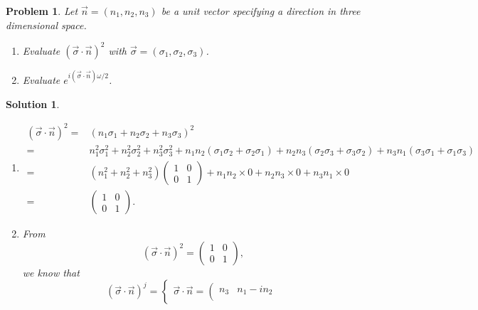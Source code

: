 \documentclass[UTF8,10pt,a4paper]{article}
\theoremstyle{Problem}
\newtheorem{prob}{Problem}
\theoremstyle{Solution}
\newtheorem*{sol}{Solution}
\begin{document}
\begin{prob}
    Let $\vec{n}=(n_1,n_2,n_3)$ be a unit vector specifying a direction in three dimensional space.
    \begin{enumerate}
        \item[(a)] Evaluate $(\vec{\sigma}\cdot\vec{n})^2$ with $\vec{\sigma}=(\sigma_1,\sigma_2,\sigma_3)$.
        \item[(b)] Evaluate $e^{i(\vec{\sigma}\cdot\vec{n})\omega/2}$.
    \end{enumerate}
\end{prob}
\begin{sol}
    \begin{enumerate}
        \item[(a)]
        \begin{align}
            \nonumber(\vec{\sigma}\cdot\vec{n})^2=&(n_1\sigma_1+n_2\sigma_2+n_3\sigma_3)^2\\
            \nonumber=&n_1^2\sigma_1^2+n_2^2\sigma_2^2+n_3^2\sigma_3^2+n_1n_2(\sigma_1\sigma_2+\sigma_2\sigma_1)+n_2n_3(\sigma_2\sigma_3+\sigma_3\sigma_2)+n_3n_1(\sigma_3\sigma_1+\sigma_1\sigma_3)\\
            \nonumber=&(n_1^2+n_2^2+n_3^2)\left(\begin{matrix}
                1&0\\
                0&1
            \end{matrix}\right)+n_1n_2\times 0+n_2n_3\times 0+n_3n_1\times 0\\
            =&\left(\begin{matrix}
                1&0\\
                0&1
            \end{matrix}\right).
        \end{align}
        \item[(b)] From
        \begin{equation}
            (\vec{\sigma}\cdot\vec{n})^2=\left(\begin{matrix}
                1&0\\
                0&1
            \end{matrix}\right),
        \end{equation}
        we know that
        \begin{equation}
            (\vec{\sigma}\cdot\vec{n})^j=\left\{\begin{array}{ll}
                \vec{\sigma}\cdot\vec{n}=\left(\begin{matrix}
                    n_3&n_1-in_2\\

\end{matrix}
\end{array}
\end{equation}
\end{enumerate}
\end{sol}
\end{document}
